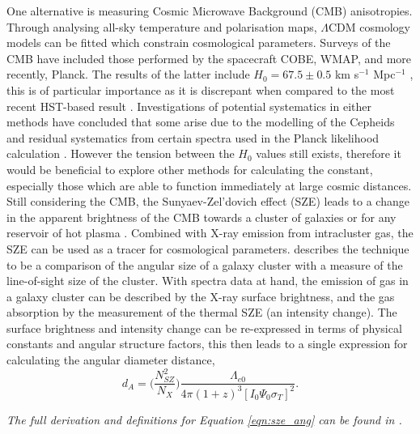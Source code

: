 \documentclass[12pt, onecolumn]{revtex4}    %
\begin{document}
One alternative is measuring Cosmic Microwave Background (CMB) anisotropies. Through analysing all-sky temperature and polarisation maps, $\Lambda$CDM cosmology models can be fitted which constrain cosmological parameters. Surveys of the CMB have included those performed by the spacecraft COBE, WMAP, and more recently, Planck. The results of the latter include $H_0=67.5\pm0.5$ km s$^{-1}$ Mpc$^{-1}$ \citep{2018arXiv180706209P}, this is of particular importance as it is discrepant when compared to the most recent HST-based result \citep{2018ApJ...855..136R}. Investigations of potential systematics in either methods have concluded that some arise due to the modelling of the Cepheids \citep{2018MNRAS.477.4534F} and residual systematics from certain spectra used in the Planck likelihood calculation \citep{2015PhRvD..91b3518S}. However the tension between the $H_0$ values still exists, therefore it would be beneficial to explore other methods for calculating the constant, especially those which are able to function immediately at large cosmic distances. \\

Still considering the CMB, the Sunyaev-Zel'dovich effect (SZE) leads to a change in the apparent brightness of the CMB towards a cluster of galaxies or for any reservoir of hot plasma \citep{1999PhR...310...97B, 2002ARA&A..40..643C}. Combined with X-ray emission from intracluster gas, the SZE can be used as a tracer for cosmological parameters. \cite{1999PhR...310...97B} describes the technique to be a comparison of the angular size of a galaxy cluster with a measure of the line-of-sight size of the cluster. With spectra data at hand, the emission of gas in a galaxy cluster can be described by the X-ray surface brightness, and the gas absorption by the measurement of the thermal SZE (an intensity change).  The surface brightness and intensity change can be re-expressed in terms of physical constants and angular structure factors, this then leads to a single expression for calculating the angular diameter distance, 
\begin{equation}
d_A = \Bigg( \frac{N^2_{SZ}}{N_X} \Bigg)\frac{\Lambda_{e0}}{4\pi (1+z)^3 [I_0 \Psi_0 \sigma_T]^2}.
\label{eqn:sze_ang}
\end{equation}

\textit{The full derivation and definitions for Equation \ref{eqn:sze_ang} can be found in \cite{1997ApJ...480..449H}.} \\
\end{document}
